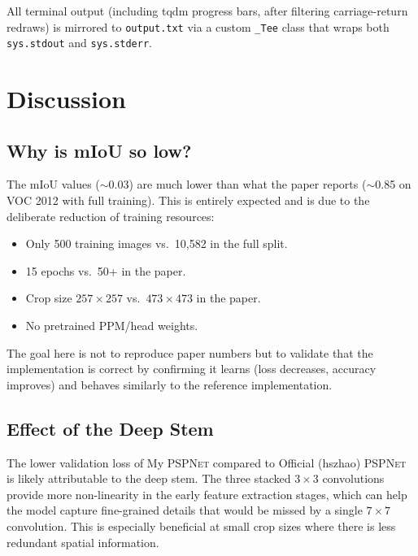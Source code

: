 \documentclass[12pt,a4paper]{article}
\newcommand{\code}[1]{\texttt{#1}}
\newcommand{\pspnet}{\textsc{PSPNet}}
\newcommand{\mypsp}{My \pspnet{}}
\newcommand{\offpsp}{Official (hszhao) \pspnet{}}
\begin{document}
All terminal output (including tqdm progress bars, after filtering
carriage-return redraws) is mirrored to \code{output.txt} via a custom
\code{\_Tee} class that wraps both \code{sys.stdout} and
\code{sys.stderr}.

\section{Discussion}

\subsection{Why is mIoU so low?}

The mIoU values ($\sim$0.03) are much lower than what the paper reports
($\sim$0.85 on VOC 2012 with full training).  This is entirely expected and
is due to the deliberate reduction of training resources:

\begin{itemize}[noitemsep]
    \item Only 500 training images vs.\ 10,582 in the full split.
    \item 15 epochs vs.\ 50+ in the paper.
    \item Crop size $257\times257$ vs.\ $473\times473$ in the paper.
    \item No pretrained PPM/head weights.
\end{itemize}

The goal here is not to reproduce paper numbers but to validate that the
implementation is correct by confirming it learns (loss decreases, accuracy
improves) and behaves similarly to the reference implementation.

\subsection{Effect of the Deep Stem}

The lower validation loss of \mypsp{} compared to \offpsp{} is likely
attributable to the deep stem.  The three stacked $3\times3$ convolutions
provide more non-linearity in the early feature extraction stages, which can
help the model capture fine-grained details that would be missed by a single
$7\times7$ convolution.  This is especially beneficial at small crop sizes
where there is less redundant spatial information.
\end{document}
